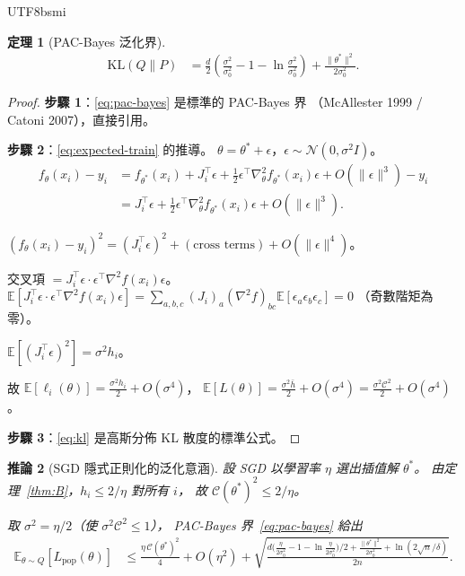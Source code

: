 \documentclass[11pt,a4paper]{article}
\newtheorem{theorem}{定理}
\newtheorem{corollary}[theorem]{推論}
\theoremstyle{definition}
\newcommand{\E}{\mathbb{E}}
\newcommand{\cC}{\mathcal{C}}
\begin{document}
\begin{CJK}{UTF8}{bsmi}
\begin{theorem}[PAC-Bayes 泛化界]
  \begin{align}
    \mathrm{KL}(Q\|P)
    &= \frac{d}{2}\left(\frac{\sigma^2}{\sigma_0^2}-1-\ln\frac{\sigma^2}{\sigma_0^2}\right)
    + \frac{\|\theta^*\|^2}{2\sigma_0^2}.\label{eq:kl}
  \end{align}
\end{theorem}

\begin{proof}
  \textbf{步驟 1}：\eqref{eq:pac-bayes} 是標準的 PAC-Bayes 界
  （McAllester 1999 / Catoni 2007），直接引用。

  \textbf{步驟 2}：\eqref{eq:expected-train} 的推導。
  $\theta=\theta^*+\epsilon$，$\epsilon\sim\mathcal{N}(0,\sigma^2 I)$。
  \begin{align*}
    f_\theta(x_i)-y_i
    &= f_{\theta^*}(x_i)+J_i^\top\epsilon+\tfrac{1}{2}\epsilon^\top\nabla^2_\theta f_{\theta^*}(x_i)\epsilon
    +O(\|\epsilon\|^3)-y_i\\
    &= J_i^\top\epsilon + \tfrac{1}{2}\epsilon^\top\nabla^2_\theta f_{\theta^*}(x_i)\epsilon+O(\|\epsilon\|^3).
  \end{align*}

  $(f_\theta(x_i)-y_i)^2 = (J_i^\top\epsilon)^2 + (\text{cross terms}) + O(\|\epsilon\|^4)$。

  交叉項 $= J_i^\top\epsilon\cdot\epsilon^\top\nabla^2 f(x_i)\epsilon$。
  $\E[J_i^\top\epsilon\cdot\epsilon^\top\nabla^2 f(x_i)\epsilon]
  = \sum_{a,b,c}(J_i)_a(\nabla^2 f)_{bc}\E[\epsilon_a\epsilon_b\epsilon_c]=0$
  （奇數階矩為零）。

  $\E[(J_i^\top\epsilon)^2] = \sigma^2 h_i$。

  故 $\E[\ell_i(\theta)] = \frac{\sigma^2 h_i}{2} + O(\sigma^4)$，
  $\E[L(\theta)] = \frac{\sigma^2\bar{h}}{2}+O(\sigma^4) = \frac{\sigma^2\cC^2}{2}+O(\sigma^4)$。

  \textbf{步驟 3}：\eqref{eq:kl} 是高斯分佈 KL 散度的標準公式。
\end{proof}

\begin{corollary}[SGD 隱式正則化的泛化意涵]\label{cor:gen}
  設 SGD 以學習率 $\eta$ 選出插值解 $\theta^*$。
  由定理~\ref{thm:B}，$h_i\leq 2/\eta$ 對所有 $i$，
  故 $\cC(\theta^*)^2\leq 2/\eta$。

  取 $\sigma^2=\eta/2$（使 $\sigma^2\cC^2\leq 1$），
  PAC-Bayes 界~\eqref{eq:pac-bayes} 給出
  \begin{align*}
    \E_{\theta\sim Q}[L_{\mathrm{pop}}(\theta)]
    &\leq \frac{\eta\,\cC(\theta^*)^2}{4} + O(\eta^2)
    + \sqrt{\frac{d\bigl(\frac{\eta}{2\sigma_0^2}-1-\ln\frac{\eta}{2\sigma_0^2}\bigr)/2
    + \frac{\|\theta^*\|^2}{2\sigma_0^2}+\ln(2\sqrt{n}/\delta)}{2n}}.
  \end{align*}


\end{corollary}
\end{CJK}
\end{document}
